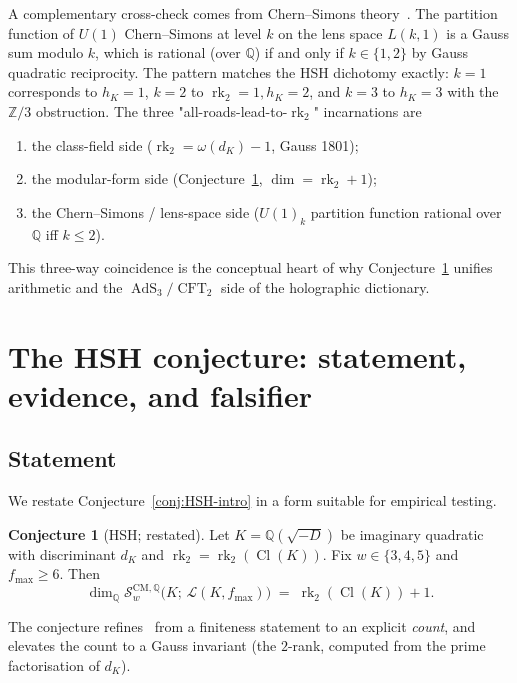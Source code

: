 \documentclass[11pt,a4paper]{amsart}
\theoremstyle{definition}
\newtheorem{conjecture}[theorem]{Conjecture}
\DeclareMathOperator{\Cl}{Cl}
\DeclareMathOperator{\rk}{rk}
\DeclareMathOperator{\AdS}{AdS}
\DeclareMathOperator{\CFT}{CFT}
\newcommand{\Q}{\mathbb{Q}}
\newcommand{\Z}{\mathbb{Z}}
\newcommand{\Lcal}{\mathcal{L}}
\newcommand{\Scal}{\mathcal{S}}
\newcommand{\hK}{h_{K}}
\newcommand{\rktwo}{\rk_{2}}
\begin{document}
A complementary cross-check comes from Chern--Simons theory~\cite{Witten1989}. The
partition function of $U(1)$ Chern--Simons at level $k$ on the lens space $L(k, 1)$ is
a Gauss sum modulo $k$, which is rational (over $\Q$) if and only if $k \in \{1, 2\}$
by Gauss quadratic reciprocity. The pattern matches the HSH dichotomy
exactly: $k = 1$ corresponds to $\hK = 1$, $k = 2$ to $\rktwo = 1, \hK = 2$, and $k = 3$
to $\hK = 3$ with the $\Z/3$ obstruction. The three "all-roads-lead-to-$\rktwo$"
incarnations are
\begin{enumerate}[label=(\roman*),leftmargin=*]
\item the class-field side ($\rktwo = \omega(d_K) - 1$, Gauss 1801);
\item the modular-form side (Conjecture~\ref{conj:HSH}, $\dim = \rktwo + 1$);
\item the Chern--Simons / lens-space side ($U(1)_k$ partition function rational over $\Q$
iff $k \le 2$).
\end{enumerate}
This three-way coincidence is the conceptual heart of why Conjecture~\ref{conj:HSH}
unifies arithmetic and the $\AdS_3/\CFT_2$ side of the holographic dictionary.

\section{The HSH conjecture: statement, evidence, and falsifier}\label{sec:HSH-numerics}

\subsection{Statement}\label{ss:HSH-statement}

We restate Conjecture~\ref{conj:HSH-intro} in a form suitable for empirical testing.
\begin{conjecture}[HSH; restated]\label{conj:HSH}
Let $K = \Q(\sqrt{-D})$ be imaginary quadratic with discriminant $d_K$ and
$\rktwo = \rktwo(\Cl(K))$. Fix $w \in \{3, 4, 5\}$ and $f_{\max} \ge 6$. Then
\begin{equation}\label{eq:HSH}
  \dim_{\Q} \Scal_w^{\mathrm{CM},\Q}\bigl(K;\, \Lcal(K, f_{\max})\bigr)
  \;=\; \rktwo(\Cl(K)) + 1.
\end{equation}
\end{conjecture}

The conjecture refines~\cite{Schutt2009} from a finiteness statement to an explicit
\emph{count}, and elevates the count to a Gauss invariant (the $2$-rank, computed from
the prime factorisation of $d_K$).
\end{document}
